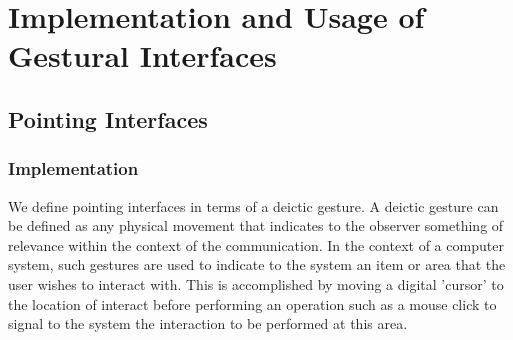 \chapter{Implementation and Usage of Gestural Interfaces}
\label{cha:implementation}

\section{Pointing Interfaces}
\label{sec:pointinginterface}


\begin{comment}
A description of the pointing interface
    - Define it as a gesture for selection or indication (quote cassell here, and others can be added later)
    - Recognize it's typical computer analogue in most pointing operations performed on a computer system, making up a core aspect of a WIMP interface besides typing
    - "pointing" in the context of natural communication (find some citations to support this)
    - Introduce 3D pointing in the context of computer systems.
    
    ^ above may belong in lit review, but write anyway
   
The implementation of our pointing interface
    - Consideration of devices that allow for pointing
    - Requirements of a pointing interface, and how we captured this info
    - Engineering to make the solution better
    - Technical limitations and how the work could be improved
    
The research
    - How do users react to these interfaces
    - Any benefits/downsides to this paradigm over typical computer usage
    - Expected applications (with citations)
    
        - The INTERACT 2013 paper :) A longer cut, with deeper analysis of the results and more discussion. Remove
        lit review etc.


- Introduce pointing interfaces as the topic of discussion
	- To be written after previous chapter has been written

- What is a pointing interface
\end{comment}


\subsection{Implementation}

We define pointing interfaces in terms of a deictic gesture. A deictic gesture can be defined as any physical movement that indicates to the observer something of relevance within the context of the communication. In the context of a computer system, such gestures are used to indicate to the system an item or area that the user wishes to interact with. This is accomplished by moving a digital 'cursor' to the location of interact before performing an operation such as a mouse click to signal to the system the interaction to be performed at this area. 

